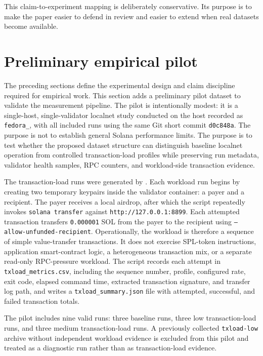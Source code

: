 \documentclass[11pt,a4paper]{article}
\begin{document}
This claim-to-experiment mapping is deliberately conservative. Its purpose is to make the paper easier to defend in review and easier to extend when real datasets become available.


\section{Preliminary empirical pilot}
\label{sec:empirical-pilot}

The preceding sections define the experimental design and claim discipline required for empirical work. This section adds a preliminary pilot dataset to validate the measurement pipeline. The pilot is intentionally modest: it is a single-host, single-validator localnet study conducted on the host recorded as \texttt{fedora\_}, with all included runs using the same Git short commit \texttt{d0c848a}. The purpose is not to establish general Solana performance limits. The purpose is to test whether the proposed dataset structure can distinguish baseline localnet operation from controlled transaction-load profiles while preserving run metadata, validator health samples, RPC counters, and workload-side transaction evidence.

The transaction-load runs were generated by . Each workload run begins by creating two temporary keypairs inside the validator container: a payer and a recipient. The payer receives a local airdrop, after which the script repeatedly invokes \texttt{solana transfer} against \texttt{http://127.0.0.1:8899}. Each attempted transaction transfers \texttt{0.000001} SOL from the payer to the recipient using \texttt{--allow-unfunded-recipient}. Operationally, the workload is therefore a sequence of simple value-transfer transactions. It does not exercise SPL-token instructions, application smart-contract logic, a heterogeneous transaction mix, or a separate read-only RPC-pressure workload. The script records each attempt in \texttt{txload\_metrics.csv}, including the sequence number, profile, configured rate, exit code, elapsed command time, extracted transaction signature, and transfer log path, and writes a \texttt{txload\_summary.json} file with attempted, successful, and failed transaction totals.

The pilot includes nine valid runs: three baseline runs, three low transaction-load runs, and three medium transaction-load runs. A previously collected \texttt{txload-low} archive without independent workload evidence is excluded from this pilot and treated as a diagnostic run rather than as transaction-load evidence.
\end{document}
